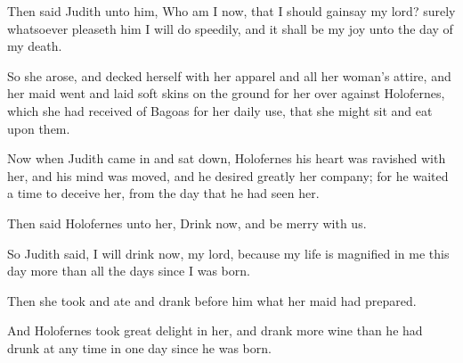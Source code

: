 {\par }{\PP {}Then said Judith unto him, Who am I now, that I should gainsay my lord? surely whatsoever pleaseth him I will do speedily, and it shall be my joy unto the day of my death.
\par }{\PP {}So she arose, and decked herself with her apparel and all her woman’s attire, and her maid went and laid soft skins on the ground for her over against Holofernes, which she had received of Bagoas for her daily use, that she might sit and eat upon them.
\par }{\PP {}Now when Judith came in and sat down, Holofernes his heart was ravished with her, and his mind was moved, and he desired greatly her company; for he waited a time to deceive her, from the day that he had seen her.
\par }{\PP {}Then said Holofernes unto her, Drink now, and be merry with us.
\par }{\PP {}So Judith said, I will drink now, my lord, because my life is magnified in me this day more than all the days since I was born.
\par }{\PP {}Then she took and ate and drank before him what her maid had prepared.
\par }{\PP {}And Holofernes took great delight in her, and drank more wine than he had drunk at any time in one day since he was born.

}
